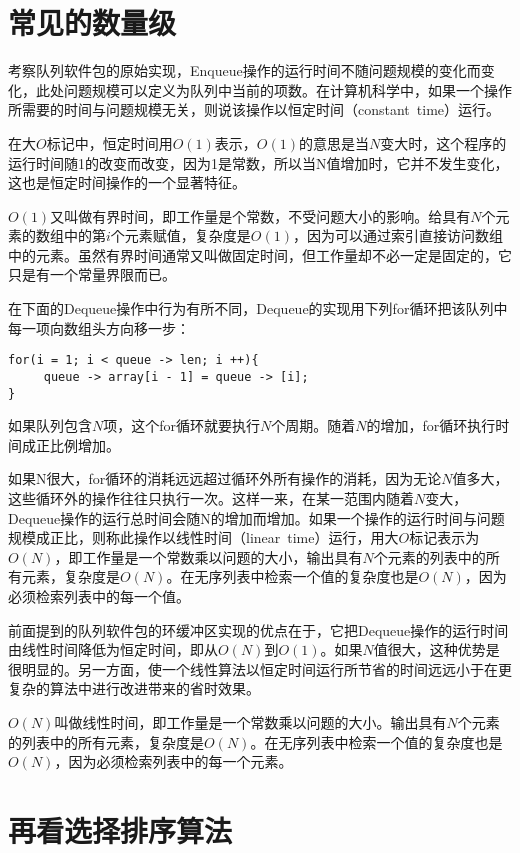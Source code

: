 \section{常见的数量级}

考察队列软件包的原始实现，Enqueue操作的运行时间不随问题规模的变化而变化，此处问题规模可以定义为队列中当前的项数。在计算机科学中，如果一个操作所需要的时间与问题规模无关，则说该操作以恒定时间（constant~time）运行。

在大$O$标记中，恒定时间用$O(1)$表示，$O(1)$的意思是当$N$变大时，这个程序的运行时间随1的改变而改变，因为1是常数，所以当N值增加时，它并不发生变化，这也是恒定时间操作的一个显著特征。

$O(1)$又叫做有界时间，即工作量是个常数，不受问题大小的影响。给具有$N$个元素的数组中的第$i$个元素赋值，复杂度是$O(1)$，因为可以通过索引直接访问数组中的元素。虽然有界时间通常又叫做固定时间，但工作量却不必一定是固定的，它只是有一个常量界限而已。

在下面的Dequeue操作中行为有所不同，Dequeue的实现用下列for循环把该队列中每一项向数组头方向移一步：
\begin{verbatim}
for(i = 1; i < queue -> len; i ++){
     queue -> array[i - 1] = queue -> [i];
}
\end{verbatim}
如果队列包含$N$项，这个for循环就要执行$N$个周期。随着$N$的增加，for循环执行时间成正比例增加。

如果N很大，for循环的消耗远远超过循环外所有操作的消耗，因为无论$N$值多大，这些循环外的操作往往只执行一次。这样一来，在某一范围内随着$N$变大，Dequeue操作的运行总时间会随N的增加而增加。如果一个操作的运行时间与问题规模成正比，则称此操作以线性时间（linear~time）运行，用大$O$标记表示为$O(N)$，即工作量是一个常数乘以问题的大小，输出具有$N$个元素的列表中的所有元素，复杂度是$O(N)$。在无序列表中检索一个值的复杂度也是$O(N)$，因为必须检索列表中的每一个值。

前面提到的队列软件包的环缓冲区实现的优点在于，它把Dequeue操作的运行时间由线性时间降低为恒定时间，即从$O(N)$到$O(1)$。如果$N$值很大，这种优势是很明显的。另一方面，使一个线性算法以恒定时间运行所节省的时间远远小于在更复杂的算法中进行改进带来的省时效果。

$O(N)$叫做线性时间，即工作量是一个常数乘以问题的大小。输出具有$N$个元素的列表中的所有元素，复杂度是$O(N)$。在无序列表中检索一个值的复杂度也是$O(N)$，因为必须检索列表中的每一个元素。

\section{再看选择排序算法}

